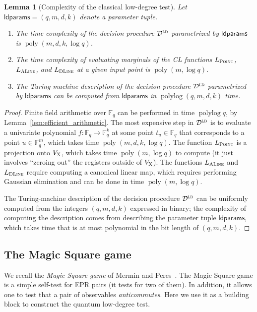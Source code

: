 \documentclass[11pt]{article}
\newtheorem{lemma}[theorem]{Lemma}
\theoremstyle{definition}
\newcommand{\F}{\ensuremath{\mathbb{F}}}
\newcommand{\ld}{\textsc{ld}}
\DeclareMathOperator{\poly}{poly}
\DeclareMathOperator{\polylog}{polylog}
\newcommand{\decider}{\mathcal{D}}
\newcommand{\labelstyle}[1]{\ensuremath{\textsc{#1}}\xspace}
\newcommand{\xpt}{\labelstyle{X}}
\newcommand{\typestyle}[1]{\ensuremath{\textsc{#1}}\xspace}
\newcommand{\Point}{\typestyle{Point}}
\newcommand{\ALine}{\typestyle{ALine}}
\newcommand{\DLine}{\typestyle{DLine}}
\newcommand{\ldparams}{\mathsf{ldparams}}
\begin{document}
\begin{lemma}[Complexity of the classical low-degree test]
  \label{lem:ld-complexity}
  Let $\ldparams = (q,m,d,k)$ denote a parameter tuple.
  \begin{enumerate}
	\item The time complexity of the decision procedure $\decider^\ld$
    parametrized by $\ldparams$ is $\poly(m, d, k, \log q)$.
	\item The time complexity of evaluating marginals of the CL functions
    $L_\Point$, $L_\ALine$, and $L_\DLine$ at a given input point is $\poly(m, \log
    q)$.
	\item The Turing machine description of the decision procedure $\decider^\ld$
    parametrized by $\ldparams$ can be computed from $\ldparams$ in $\polylog
    (q,m,d,k)$ time.
  \end{enumerate}
\end{lemma}

\begin{proof}
	Finite field arithmetic over $\F_q$ can be performed in time $\polylog q$, by
  Lemma~\ref{lem:efficient_arithmetic}.
	The most expensive step in $\decider^\ld$ is to evaluate a univariate
  polynomial $f: \F_q \to \F_q^k$ at some point $t_u \in \F_q$ that corresponds
  to a point $u \in \F_q^m$, which takes time $\poly(m,d,k,\log q)$.
  The function $L_\Point$ is a projection onto $V_\xpt$, which takes time
  $\poly(m,\log q)$ to compute (it just involves ``zeroing out'' the registers
  outside of $V_\xpt$).
  The functions $L_\ALine$ and $L_\DLine$ require computing a canonical linear
  map, which requires performing Gaussian elimination and can be done in time
  $\poly(m,\log q)$.

  The Turing-machine description of the decision procedure $\decider^\ld$ can be
  uniformly computed from the integers $(q,m,d,k)$ expressed in binary; the
  complexity of computing the description comes from describing the parameter
  tuple $\ldparams$, which takes time that is at most polynomial in the bit
  length of $(q,m,d,k)$.
\end{proof}

\subsection{The Magic Square game}
\label{sec:ms}

We recall the \emph{Magic Square game} of Mermin and
Peres~\cite{mermin1990simple,peres1990incompatible,aravind2002simple}.
The Magic Square game is a simple self-test for EPR pairs (it tests for two of
them). In addition, it allows one to test that a pair of observables
\emph{anticommutes}.
Here we use it as a building block to construct the quantum low-degree test. 
\end{document}
